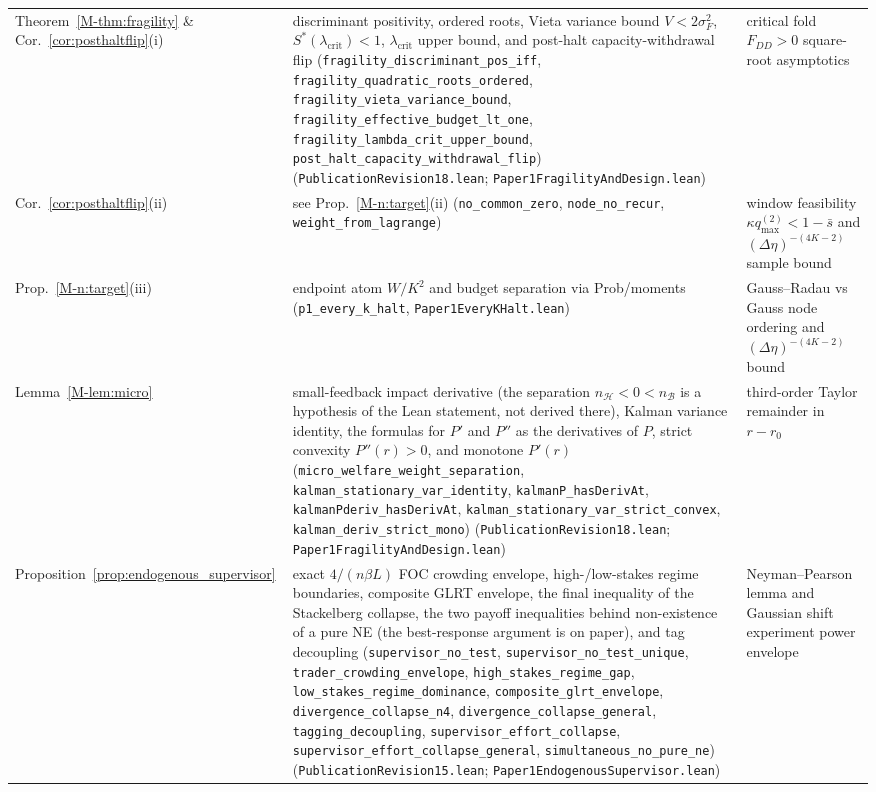 \documentclass[12pt]{article}
\theoremstyle{definition}
\theoremstyle{remark}
\begin{document}
{\begin{longtable}{>{\raggedright\arraybackslash}p{}>{\raggedright\arraybackslash}p{}>{\raggedright\arraybackslash}p{}}
Theorem~\ref{M-thm:fragility} \& Cor.~\ref{cor:posthaltflip}(i) & discriminant positivity, ordered roots, Vieta variance bound $V<2\sigma_F^2$, $S^*(\lambda_{\mathrm{crit}})<1$, $\lambda_{\mathrm{crit}}$ upper bound, and post-halt capacity-withdrawal flip (\texttt{fragility\_discriminant\_pos\_iff}, \texttt{fragility\_quadratic\_roots\_ordered}, \texttt{fragility\_vieta\_variance\_bound}, \texttt{fragility\_effective\_budget\_lt\_one}, \texttt{fragility\_lambda\_crit\_upper\_bound}, \texttt{post\_halt\_capacity\_withdrawal\_flip}) (\nolinkurl{PublicationRevision18.lean}; \nolinkurl{Paper1FragilityAndDesign.lean}) & critical fold $F_{DD}>0$ square-root asymptotics\\
Cor.~\ref{cor:posthaltflip}(ii) & see Prop.~\ref{M-n:target}(ii) (\texttt{no\_common\_zero}, \texttt{node\_no\_recur}, \texttt{weight\_from\_lagrange}) & window feasibility $\kappa q_{\max}^{(2)} < 1 - \bar s$ and $(\Delta\eta)^{-(4K-2)}$ sample bound\\
Prop.~\ref{M-n:target}(iii) & endpoint atom $W/K^2$ and budget separation via Prob/moments (\texttt{p1\_every\_k\_halt}, \nolinkurl{Paper1EveryKHalt.lean}) & Gauss--Radau vs Gauss node ordering and $(\Delta\eta)^{-(4K-2)}$ bound\\
Lemma~\ref{M-lem:micro} & small-feedback impact derivative (the separation $n_{\mathcal{H}}<0<n_{\mathcal{B}}$ is a hypothesis of the Lean statement, not derived there), Kalman variance identity, the formulas for $P'$ and $P''$ as the derivatives of $P$, strict convexity $P''(r)>0$, and monotone $P'(r)$ (\texttt{micro\_welfare\_weight\_separation}, \texttt{kalman\_stationary\_var\_identity}, \texttt{kalmanP\_hasDerivAt}, \texttt{kalmanPderiv\_hasDerivAt}, \texttt{kalman\_stationary\_var\_strict\_convex}, \texttt{kalman\_deriv\_strict\_mono}) (\nolinkurl{PublicationRevision18.lean}; \nolinkurl{Paper1FragilityAndDesign.lean}) & third-order Taylor remainder in $r-r_0$\\
Proposition~\ref{prop:endogenous_supervisor} & exact $4/(n \beta L)$ FOC crowding envelope, high-/low-stakes regime boundaries, composite GLRT envelope, the final inequality of the Stackelberg collapse, the two payoff inequalities behind non-existence of a pure NE (the best-response argument is on paper), and tag decoupling (\texttt{supervisor\_no\_test}, \texttt{supervisor\_no\_test\_unique}, \texttt{trader\_crowding\_envelope}, \texttt{high\_stakes\_regime\_gap}, \texttt{low\_stakes\_regime\_dominance}, \texttt{composite\_glrt\_envelope}, \texttt{divergence\_collapse\_n4}, \texttt{divergence\_collapse\_general}, \texttt{tagging\_decoupling}, \texttt{supervisor\_effort\_collapse}, \texttt{supervisor\_effort\_collapse\_general}, \texttt{simultaneous\_no\_pure\_ne}) (\nolinkurl{PublicationRevision15.lean}; \nolinkurl{Paper1EndogenousSupervisor.lean}) & Neyman--Pearson lemma and Gaussian shift experiment power envelope\\

\end{longtable}}
\end{document}
